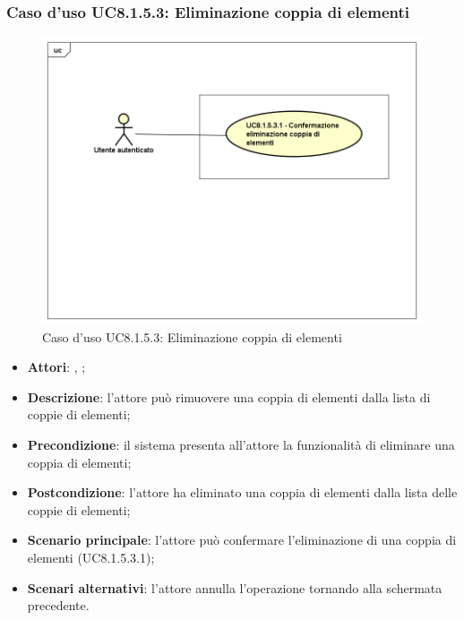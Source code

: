 	\subsubsection{Caso d'uso UC8.1.5.3: Eliminazione coppia di elementi}
	\begin{figure}[h]
		\centering
		\includegraphics[scale=0.5,keepaspectratio]{UML/UC8_1_5_3.png}
		\caption{Caso d'uso UC8.1.5.3: Eliminazione coppia di elementi}
	\end{figure}
	\FloatBarrier
	\begin{itemize}
		\item \textbf{Attori}: \uau, \uaupro;
		\item \textbf{Descrizione}: l'attore può rimuovere una coppia di elementi dalla lista di coppie di elementi;
		\item \textbf{Precondizione}: il sistema presenta all'attore la funzionalità di eliminare una coppia di elementi;
		\item \textbf{Postcondizione}: l'attore ha eliminato una coppia di elementi dalla lista delle coppie di elementi;
		\item \textbf{Scenario principale}: l'attore può confermare l'eliminazione di una coppia di elementi (UC8.1.5.3.1);	
		\item \textbf{Scenari alternativi}: l'attore annulla l'operazione tornando alla schermata precedente.
	\end{itemize}

